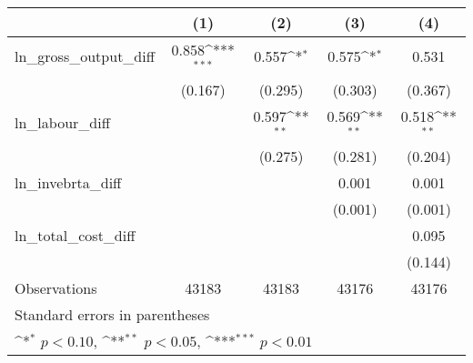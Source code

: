 {
\def\sym#1{\ifmmode^{#1}\else\(^{#1}\)\fi}
\begin{tabular}{l*{4}{c}}
\hline\hline
                &\multicolumn{1}{c}{(1)}         &\multicolumn{1}{c}{(2)}         &\multicolumn{1}{c}{(3)}         &\multicolumn{1}{c}{(4)}         \\
\hline
ln\_gross\_output\_diff&    0.858\sym{***}&    0.557\sym{*}  &    0.575\sym{*}  &    0.531         \\
                &  (0.167)         &  (0.295)         &  (0.303)         &  (0.367)         \\
[1em]
ln\_labour\_diff  &                  &    0.597\sym{**} &    0.569\sym{**} &    0.518\sym{**} \\
                &                  &  (0.275)         &  (0.281)         &  (0.204)         \\
[1em]
ln\_invebrta\_diff&                  &                  &    0.001         &    0.001         \\
                &                  &                  &  (0.001)         &  (0.001)         \\
[1em]
ln\_total\_cost\_diff&                  &                  &                  &    0.095         \\
                &                  &                  &                  &  (0.144)         \\
\hline
Observations    &    43183         &    43183         &    43176         &    43176         \\
\hline\hline
\multicolumn{5}{l}{\footnotesize Standard errors in parentheses}\\
\multicolumn{5}{l}{\footnotesize \sym{*} \(p<0.10\), \sym{**} \(p<0.05\), \sym{***} \(p<0.01\)}\\
\end{tabular}
}
